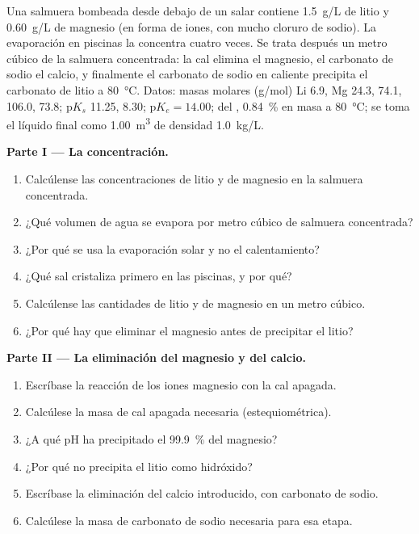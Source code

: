 \begin{problem}
\label{pb:b1:s-block:1}
Una salmuera bombeada desde debajo de un salar contiene \qty{1.5}{g/L} de
litio y \qty{0.60}{g/L} de magnesio (en forma de iones, con mucho cloruro
de sodio). La evaporación en piscinas la concentra cuatro veces. Se trata
después un metro cúbico de la salmuera concentrada: la cal elimina el
magnesio, el carbonato de sodio el calcio, y finalmente el carbonato de
sodio en caliente precipita el carbonato de litio a \qty{80}{\celsius}.
Datos: masas molares (\unit{g/mol}) Li 6.9, Mg 24.3,
 74.1,  106.0,  73.8; $\mathrm{p}K_s$
 11.25,  8.30; $\mathrm{p}K_e = 14.00$; 
del , \qty{0.84}{\percent} en masa a \qty{80}{\celsius}; se
toma el líquido final como \qty{1.00}{m^3} de densidad \qty{1.0}{kg/L}.

\medskip
\noindent\textbf{Parte I --- La concentración.}
\begin{enumerate}
  \item Calcúlense las concentraciones de litio y de magnesio en la
        salmuera concentrada.
  \item ¿Qué volumen de agua se evapora por metro cúbico de salmuera
        concentrada?
  \item ¿Por qué se usa la evaporación solar y no el calentamiento?
  \item ¿Qué sal cristaliza primero en las piscinas, y por qué?
  \item Calcúlense las cantidades de litio y de magnesio en un metro
        cúbico.
  \item ¿Por qué hay que eliminar el magnesio antes de precipitar el
        litio?
\end{enumerate}

\medskip
\noindent\textbf{Parte II --- La eliminación del magnesio y del calcio.}
\begin{enumerate}[resume]
  \item Escríbase la reacción de los iones magnesio con la cal apagada.
  \item Calcúlese la masa de cal apagada necesaria (estequiométrica).
  \item ¿A qué pH ha precipitado el \qty{99.9}{\percent} del magnesio?
  \item ¿Por qué no precipita el litio como hidróxido?
  \item Escríbase la eliminación del calcio introducido, con carbonato de
        sodio.
  \item Calcúlese la masa de carbonato de sodio necesaria para esa etapa.
\end{enumerate}


\end{problem}
